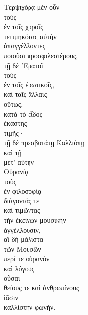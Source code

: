 {\large
\begin{greek}
\noindent 
Τερψιχόρᾳ μὲν οὖν \\
\tabto{2em} τοὺς \\
\tabto{4em} ἐν τοῖς χοροῖς \\
\tabto{2em} τετιμηκότας αὐτὴν \\
ἀπαγγέλλοντες \\
\tabto{2em} ποιοῦσι προσφιλεστέρους, \\
τῇ δὲ ᾿Ερατοῖ \\
\tabto{2em} τοὺς \\
\tabto{4em} ἐν τοῖς ἐρωτικοῖς, \\
καὶ ταῖς ἄλλαις \\
\tabto{2em} οὕτως, \\
\tabto{4em} κατὰ τὸ εἶδος \\
\tabto{6em} ἑκάστης \\
\tabto{8em} τιμῆς· \\

\noindent τῇ δὲ πρεσβυτάτῃ Καλλιόπῃ \\
καὶ τῇ \\
\tabto{2em} μετ' αὐτὴν \\
Οὐρανίᾳ \\
\tabto{2em} τοὺς \\
\tabto{4em} ἐν φιλοσοφίᾳ \\
\tabto{2em} διάγοντάς τε \\
\tabto{2em} καὶ τιμῶντας \\
\tabto{4em} τὴν ἐκείνων μουσικὴν \\
ἀγγέλλουσιν, \\
\tabto{2em} αἳ δὴ μάλιστα \\
\tabto{4em} τῶν Μουσῶν \\
\tabto{4em} περί τε οὐρανὸν \\
\tabto{6em} καὶ λόγους \\
\tabto{2em} οὖσαι \\
\tabto{6em} θείους τε καὶ ἀνθρωπίνους \\
\tabto{2em} ἱᾶσιν \\
\tabto{4em} καλλίστην φωνήν.\\

\end{greek}
}

